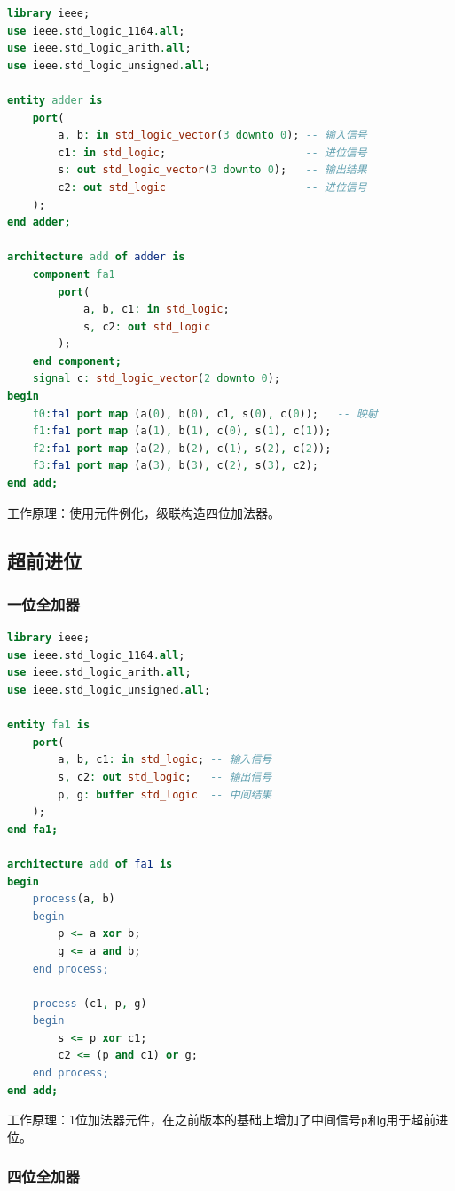 \documentclass[a4paper]{article}
\begin{document}
\begin{lstlisting}[language=vhdl]
library ieee;
use ieee.std_logic_1164.all;
use ieee.std_logic_arith.all;
use ieee.std_logic_unsigned.all;

entity adder is
    port(
        a, b: in std_logic_vector(3 downto 0); -- 输入信号
        c1: in std_logic;                      -- 进位信号
        s: out std_logic_vector(3 downto 0);   -- 输出结果
        c2: out std_logic                      -- 进位信号
    );
end adder;

architecture add of adder is
    component fa1
        port(
            a, b, c1: in std_logic;
            s, c2: out std_logic
        );
    end component;
    signal c: std_logic_vector(2 downto 0);
begin
    f0:fa1 port map (a(0), b(0), c1, s(0), c(0));   -- 映射
    f1:fa1 port map (a(1), b(1), c(0), s(1), c(1));
    f2:fa1 port map (a(2), b(2), c(1), s(2), c(2));
    f3:fa1 port map (a(3), b(3), c(2), s(3), c2);
end add;
\end{lstlisting}

工作原理：使用元件例化，级联构造四位加法器。

\subsection{超前进位}
\subsubsection{一位全加器}

\begin{lstlisting}[language=vhdl]
library ieee;
use ieee.std_logic_1164.all;
use ieee.std_logic_arith.all;
use ieee.std_logic_unsigned.all;

entity fa1 is
    port(
        a, b, c1: in std_logic; -- 输入信号
        s, c2: out std_logic;   -- 输出信号
        p, g: buffer std_logic  -- 中间结果
    );
end fa1;

architecture add of fa1 is
begin
    process(a, b)
    begin
        p <= a xor b;
        g <= a and b;
    end process;
    
    process (c1, p, g)
    begin
        s <= p xor c1;
        c2 <= (p and c1) or g;
    end process;
end add;
\end{lstlisting}

工作原理：1位加法器元件，在之前版本的基础上增加了中间信号\texttt{p}和\texttt{g}用于超前进位。

\subsubsection{四位全加器}
\end{document}

